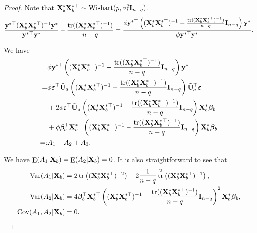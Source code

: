 \documentclass[11pt]{article}
\DeclareMathOperator{\mytr}{tr}
\DeclareMathOperator{\myE}{E}
\DeclareMathOperator{\myVar}{Var}
\newcommand{\By}{\mathbf{y}}    \newcommand{\Bz}{\mathbf{z}}
\newcommand{\bfsym}[1]{\ensuremath{\boldsymbol{#1}}}
\def\bbeta{\bfsym \beta}
\theoremstyle{plain}
\theoremstyle{definition}
\theoremstyle{remark}
\begin{document}
\begin{proof}
    Note that $\mathbf{X}_b^* \mathbf{X}_b^{*\top} \sim \text{Wishart}(p,\sigma_b^2 \mathbf{I}_{n-q})$.
    \begin{equation*}
        \frac{\By^{*\top} (\BX_b^* \BX_b^{*\top})^{-1} \By^*}{\By^{*\top} \By^*} -\frac{\mytr ((\BX_b^* \BX_b^{*\top})^{-1})}{n-q}
        =
        \frac{\phi\By^{*\top}\left( (\BX_b^* \BX_b^{*\top})^{-1} 
                -\frac{\mytr ( (\BX_b^* \BX_b^{*\top})^{-1})}{n-q} 
                \BI_{n-q}
        \right) \By^*}{\phi\By^{*\top} \By^*}.
    \end{equation*}

We have
\begin{equation*}
    \begin{split}
&
\phi\By^{*\top}\left( (\BX_b^* \BX_b^{*\top})^{-1} 
                -\frac{\mytr ( (\BX_b^* \BX_b^{*\top})^{-1})}{n-q} 
                \BI_{n-q}
        \right) \By^*
        \\
        =&
\phi
\bepsilon^{\top} \tilde \BU_a \left( (\BX_b^* \BX_b^{*\top})^{-1} 
                -\frac{\mytr ( (\BX_b^* \BX_b^{*\top})^{-1})}{n-q} 
                \BI_{n-q}
        \right) \tilde \BU_a^\top \bepsilon
        \\
        &+
2\phi\bepsilon^{\top} \tilde \BU_a \left( (\BX_b^* \BX_b^{*\top})^{-1} 
                -\frac{\mytr ( (\BX_b^* \BX_b^{*\top})^{-1})}{n-q} 
                \BI_{n-q}
            \right)  \BX_b^* \bbeta_b
        \\
        &+
\phi
 \bbeta_b^\top
 \BX_b^{*\top}
\left( (\BX_b^* \BX_b^{*\top})^{-1} 
                -\frac{\mytr ( (\BX_b^* \BX_b^{*\top})^{-1})}{n-q} 
                \BI_{n-q}
            \right)  \BX_b^* \bbeta_b
            \\
            =:& A_1 +A_2 +A_3.
    \end{split}
\end{equation*}

We have $\myE (A_1|\BX_b)=\myE (A_2|\BX_b)=0$.
It is also straightforward to see that 
\begin{equation*}
    \begin{split}
        \myVar (A_1|\BX_b)
        &= 2\mytr  \left( (\BX_b^* \BX_b^{*\top})^{-2} \right)
                -2\frac{1}{n-q} \mytr^2 \left( (\BX_b^* \BX_b^{*\top})^{-1}\right)
                ,
                \\
                \myVar (A_2|\BX_b)&= 
                4\bbeta_b^\top \BX_b^{*\top}
                \left( (\BX_b^* \BX_b^{*\top})^{-1} 
                -\frac{\mytr ( (\BX_b^* \BX_b^{*\top})^{-1})}{n-q} 
                \BI_{n-q}
            \right)^2  \BX_b^* \bbeta_b
            ,\\
            \text{Cov} (A_1,A_2|\BX_b)&=0.
    \end{split}
\end{equation*}


\end{proof}
\end{document}
